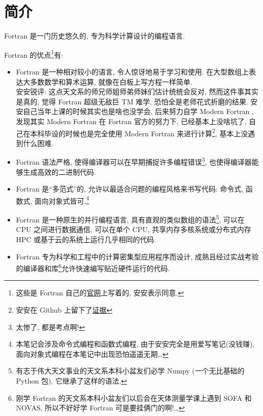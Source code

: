 \chapter{简介}\label{introduction}

Fortran 是一门历史悠久的, 专为科学计算设计的编程语言.

Fortran 的优点\footnote{这些是 Fortran 自己的\href{https://fortran-lang.org/}{官网}上写着的, 安安表示同意.}有:
\begin{itemize}
    \item Fortran 是一种相对较小的语言, 令人惊讶地易于学习和使用. 在大型数组上表达大多数数学和算术运算, 就像在白板上写方程一样简单.\\安安锐评: 这点天文系的师兄师姐师弟师妹们估计统统会反对, 然而这件事其实是真的. 觉得 Fortran 超级无敌巨 TM 难学, 恐怕全是老师花式折磨的结果. 安安自己当年上课的时候其实也是啥也没学会, 后来努力自学 Modern Fortran , 发现其实 Modern Fortran 在 Fortran 官方的努力下, 已经基本上没啥坑了, 自己在本科毕设的时候也是完全使用 Modern Fortran 来进行计算\footnote{安安在 Github 上留下了\href{https://github.com/GasinAn/echo1}{证据}}, 基本上没遇到什么困难.
    \item Fortran 语法严格, 使得编译器可以在早期捕捉许多编程错误\footnote{太惨了, 都是考点啊!}, 也使得编译器能够生成高效的二进制代码.
    \item Fortran 是``多范式''的, 允许以最适合问题的编程风格来书写代码: 命令式, 函数式, 面向对象式皆可.\footnote{本笔记会涉及命令式编程和函数式编程, 由于安安完全是用爱写笔记(没钱赚), 面向对象式编程在本笔记中出现恐怕遥遥无期\dots{}}
    \item Fortran 是一种原生的并行编程语言, 具有直观的类似数组的语法\footnote{有志于伟大天文事业的天文系本科小盆友们必学 Numpy (一个无比基础的 Python 包), 它继承了这样的语法.}, 可以在 CPU 之间进行数据通信, 可以在单个 CPU, 共享内存多核系统或分布式内存 HPC 或基于云的系统上运行几乎相同的代码.
    \item Fortran 专为科学和工程中的计算密集型应用程序而设计, 成熟且经过实战考验的编译器和库\footnote{刚学 Fortran 的天文系本科小盆友们以后会在天体测量学课上遇到 SOFA 和 NOVAS, 所以不好好学 Fortran 可是要挂俩门的啊!\dots{}}允许快速编写贴近硬件运行的代码.
\end{itemize}

